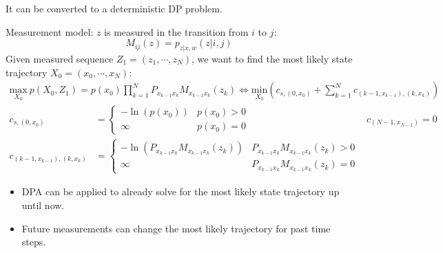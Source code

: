 \documentclass[landscape,a0paper,fontscale=0.285]{baposter} %
\newcommand{\compresslist}{ %
\setlength{\itemsep}{1pt}
\setlength{\parskip}{0pt}
\setlength{\parsep}{0pt}
}
\begin{document}
\begin{poster}
{\begin{minipage}{0.575\textwidth}
\begin{itemize}
    It can be converted to a deterministic DP problem.

    \end{itemize}
  
\end{minipage}



  

\colorbox[HTML]{CCFFFF}{}
Measurement model: \( z \) is measured in the transition from \( i \) to \( j \):\vspace{-0.3cm}
$$
M_{ij}(z) = p_{z|x,w}(z|i,j)
$$
\colorbox[HTML]{CCFFFF}{}
Given measured sequence \( Z_1 = (z_1, \cdots, z_N) \), we want to find the most likely state trajectory \( X_0 = (x_0, \cdots, x_N) \):\vspace{-0.5cm}
$$
\begin{aligned}
\underset{X_0}{\text{max}}~p(X_0, Z_1) = p(x_0) \prod_{k=1}^N P_{x_{k-1}x_k}M_{x_{k-1}x_k}(z_k) \Leftrightarrow \underset{X_0}{\text{min}}\left(c_{s,(0,x_0)}+\sum_{k=1}^Nc_{(k-1,x_{k-1}),(k,x_k)}\right)
\end{aligned}
$$
$$
\begin{aligned}
c_{s,(0,x_0)} &= \begin{cases}
-\ln(p(x_0)) & p(x_0) > 0 \\
\infty & p(x_0) = 0
\end{cases} & c_{(N-1,x_{N-1})} = 0
\\
c_{(k-1,x_{k-1}),(k,x_k)} &= \begin{cases}
-\ln(P_{x_{k-1}x_k}M_{x_{k-1}x_k}(z_k)) & P_{x_{k-1}x_k}M_{x_{k-1}x_k}(z_k) > 0 \\
\infty & P_{x_{k-1}x_k}M_{x_{k-1}x_k}(z_k) = 0
\end{cases} 
\end{aligned}
$$

\begin{itemize}\compresslist
  \item DPA can be applied to already solve for the most likely state trajectory up until now.
  \item Future measurements can change the most likely trajectory for past time steps.
\end{itemize}

\colorbox[HTML]{CCFFFF}{}

}
\end{poster}
\end{document}
